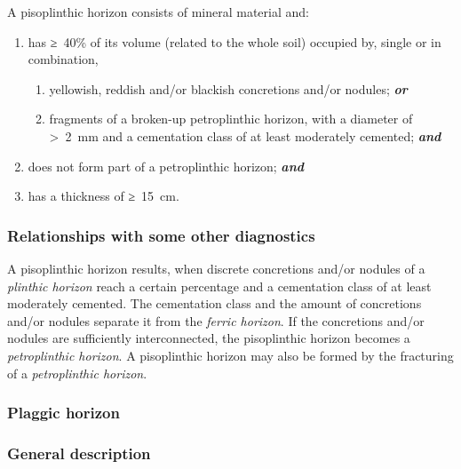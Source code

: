 \documentclass[
  letterpaper,
  DIV=11,
  numbers=noendperiod]{scrreprt}
\providecommand{\tightlist}{%
  \setlength{\itemsep}{0pt}\setlength{\parskip}{0pt}}\usepackage{longtable,booktabs,array}
\begin{document}
A pisoplinthic horizon consists of mineral material and:

\begin{enumerate}
\def\labelenumi{\arabic{enumi}.}
\item
  has ≥~40\% of its volume (related to the whole soil) occupied by,
  single or in combination,

  \begin{enumerate}
  \def\labelenumii{\alph{enumii}.}
  \tightlist
  \item
    yellowish, reddish and/or blackish concretions and/or nodules;
    \textbf{\emph{or}}
  \item
    fragments of a broken-up petroplinthic horizon, with a diameter of
    \textgreater~2~mm and a cementation class of at least moderately
    cemented; \textbf{\emph{and}}
  \end{enumerate}
\item
  does not form part of a petroplinthic horizon; \textbf{\emph{and}}
\item
  has a thickness of ≥~15~cm.
\end{enumerate}

\hypertarget{relationships-with-some-other-diagnostics-27}{%
\subsubsection{Relationships with some other
diagnostics}\label{relationships-with-some-other-diagnostics-27}}

A pisoplinthic horizon results, when discrete concretions and/or nodules
of a \emph{plinthic horizon} reach a certain percentage and a
cementation class of at least moderately cemented. The cementation class
and the amount of concretions and/or nodules separate it from the
\emph{ferric horizon}. If the concretions and/or nodules are
sufficiently interconnected, the pisoplinthic horizon becomes a
\emph{petroplinthic horizon}. A pisoplinthic horizon may also be formed
by the fracturing of a \emph{petroplinthic horizon}.

\hypertarget{plaggic-horizon}{%
\subsubsection{Plaggic horizon}\label{plaggic-horizon}}

\hypertarget{general-description-28}{%
\subsubsection{General description}\label{general-description-28}}
\end{document}
